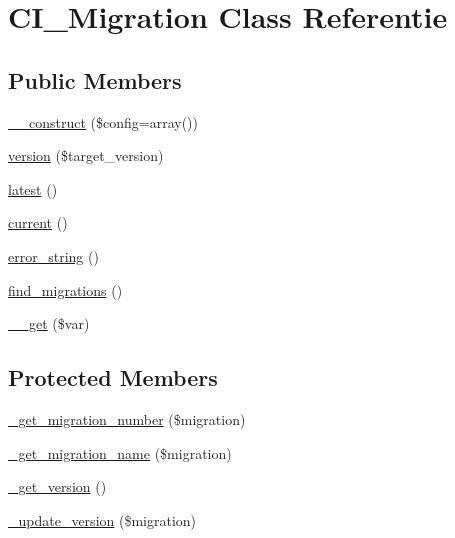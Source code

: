 \hypertarget{class_c_i___migration}{}\section{C\+I\+\_\+\+Migration Class Referentie}
\label{class_c_i___migration}
\subsection*{Public Members}
\begin{DoxyCompactItemize}
\item 
\mbox{\hyperlink{class_c_i___migration_af7f9493844d2d66e924e3c1df51ce616}{\+\_\+\+\_\+construct}} (\$config=array())
\item 
\mbox{\hyperlink{class_c_i___migration_a9192bce789e541754ba481dfec6bb39a}{version}} (\$target\+\_\+version)
\item 
\mbox{\hyperlink{class_c_i___migration_a23502a9f08bfc74caf3914113d11db2b}{latest}} ()
\item 
\mbox{\hyperlink{class_c_i___migration_af343507d1926e6ecf964625d41db528c}{current}} ()
\item 
\mbox{\hyperlink{class_c_i___migration_aad434fa9bec99e30d6a86beb5c2607df}{error\+\_\+string}} ()
\item 
\mbox{\hyperlink{class_c_i___migration_a6581e916a05e39e46c09fe9878b2d93a}{find\+\_\+migrations}} ()
\item 
\mbox{\hyperlink{class_c_i___migration_a8fb2d9cdca17b87400e780b9f9720933}{\+\_\+\+\_\+get}} (\$var)
\end{DoxyCompactItemize}
\subsection*{Protected Members}
\begin{DoxyCompactItemize}
\item 
\mbox{\hyperlink{class_c_i___migration_a79102ae684cc42b629c3cff885850c81}{\+\_\+get\+\_\+migration\+\_\+number}} (\$migration)
\item 
\mbox{\hyperlink{class_c_i___migration_a71388693ccdefaea24ca259a0f389806}{\+\_\+get\+\_\+migration\+\_\+name}} (\$migration)
\item 
\mbox{\hyperlink{class_c_i___migration_a1de42592aaef750bc3782e873b1b6d5f}{\+\_\+get\+\_\+version}} ()
\item 
\mbox{\hyperlink{class_c_i___migration_a6eb30e31b93e1cf882527be723d52fcd}{\+\_\+update\+\_\+version}} (\$migration)
\end{DoxyCompactItemize}
